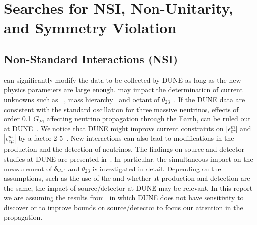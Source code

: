 
\section{Searches for NSI, Non-Unitarity, and  Symmetry Violation}
\subsection{Non-Standard Interactions (NSI)}
\label{sec:nsi}
can significantly modify the data to be collected by DUNE as long as the new physics parameters are large enough.  may impact the determination of current unknowns such as ~\cite{Masud:2015xva,Masud:2016bvp}, mass hierarchy~\cite{Masud:2016gcl} and octant of $\theta_{23}$~\cite{Agarwalla:2016fkh}. If the DUNE data are consistent with the standard oscillation for three massive neutrinos,  effects of order 0.1 $G_F$, affecting neutrino propagation through the Earth, can be ruled out at DUNE~\cite{deGouvea:2015ndi,Coloma:2015kiu}. We notice that DUNE might improve current constraints on $|\epsilon^m_{e \tau}|$ and $|\epsilon^m_{e \mu}|$ by a factor 2-5~\cite{Ohlsson:2012kf,Miranda:2015dra,Farzan:2017xzy}. New    interactions can also lead to modifications in the production and the detection of neutrinos. The findings on source and detector  studies at DUNE are presented in~\cite{Blennow:2016etl,Bakhti:2016gic}. In particular, the simultaneous impact on the measurement of $\delta_{\rm CP}$ and $\theta_{23}$ is investigated in detail. Depending on the assumptions, such as the use of the   and whether  at production and detection are the same, the impact of source/detector  at DUNE may be relevant. In this report we are assuming the results from~\cite{Blennow:2016etl} in which DUNE does not have sensitivity to discover or to improve bounds on source/detector  to focus our attention in the propagation.

